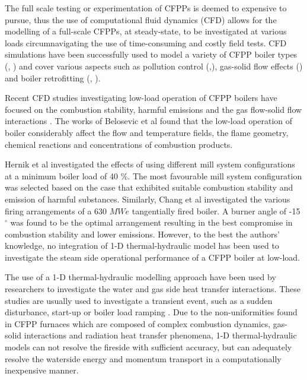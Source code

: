 \documentclass[review]{elsarticle}
\begin{document}
The full scale testing or experimentation of CFPPs is deemed to expensive to pursue, thus the use of computational fluid dynamics (CFD) allows for the modelling of a full-scale CFPPs, at steady-state, to be investigated at various loads circumnavigating the use of time-consuming and costly field tests. CFD simulations have been successfully used to model a variety of CFPP boiler types (\cite{Laubscher2019a}, \cite{Gu2020}) and cover various aspects such as pollution control (\cite{Du2017},\cite{Fan2001}), gas-solid flow effects (\cite{Chen2017}) and boiler retrofitting (\citep{Gu2020}, \cite{He2007}).

Recent CFD studies investigating low-load operation of CFPP boilers have focused on the combustion stability, harmful emissions and the gas flow-solid flow interactions \cite{Jiang2021}. The works of Belosevic et al \citep{Belosevic2019a} found that the low-load operation of boiler considerably affect the flow and temperature fields, the flame geometry, chemical reactions and concentrations of combustion products.

Hernik et al \cite{Hernik2020} investigated the effects of using different mill system configurations at a minimum boiler load of 40 $\%$. The most favourable mill system configuration was selected based on the case that exhibited suitable combustion stability and emission of harmful substances. Similarly, Chang et al \citep{Chang2021} investigated the various firing arrangements of a 630 $MWe$ tangentially fired boiler. A burner angle of -15 $^\circ$ was found to be the optimal arrangement resulting in the best compromise in combustion stability and lower emissions. However, to the best the authors' knowledge, no integration of 1-D thermal-hydraulic model has been used to investigate the steam side operational performance of a CFPP boiler at low-load.

The use of a 1-D thermal-hydraulic modelling approach have been used by researchers to investigate the water and gas side heat transfer interactions. These studies are usually used to investigate a transient event, such as a sudden disturbance, start-up or boiler load ramping \cite{Alobaid2017}. Due to the non-uniformities found in CFPP furnaces which are composed of complex combustion dynamics, gas-solid interactions and  radiation heat transfer phenomena, 1-D thermal-hydraulic models can not resolve the fireside with sufficient accuracy, but can adequately resolve the waterside energy and momentum transport in a computationally inexpensive manner. 
\end{document}
